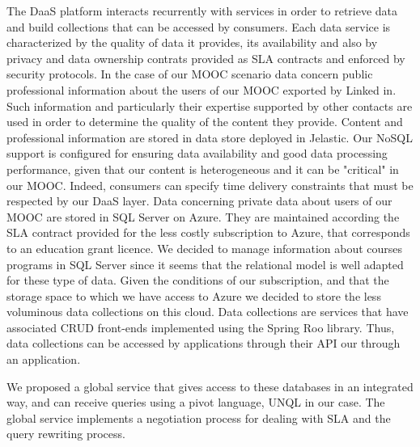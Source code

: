 The DaaS platform interacts recurrently with services in order to retrieve data and build collections that can be accessed by consumers. Each data service is characterized by the quality of data it provides, its availability and also by privacy and data ownership contrats provided as SLA contracts and enforced by security protocols. In the case of our MOOC scenario data concern public professional information about the users of our MOOC exported by Linked in. Such information and particularly their expertise supported by other contacts are used in order to determine the quality of the content they provide. Content and professional information are stored in data store deployed in Jelastic.  Our NoSQL support is configured for ensuring data availability and good data processing performance, given that our content is heterogeneous and it can be "critical" in our MOOC. Indeed, consumers can specify time delivery constraints that must be respected by our DaaS layer. Data concerning private data about users of our MOOC are stored in SQL Server on Azure. They are maintained according the  SLA contract provided for the less costly subscription to Azure, that corresponds to an education grant licence. We decided to manage information about courses programs in SQL Server since it seems that the relational model is well adapted for these type of data. Given the conditions of our subscription, and that the storage space to which we have access to Azure we decided to store the less voluminous data collections on this cloud. Data collections are services that have associated CRUD front-ends implemented using the Spring Roo library. Thus, data collections can be accessed by applications through their API our through an application. 

We proposed a global service that gives access to these databases in an integrated way, and can receive queries using a pivot language, UNQL in our case. The global service implements a negotiation process for dealing with SLA and  the  query rewriting process. 
